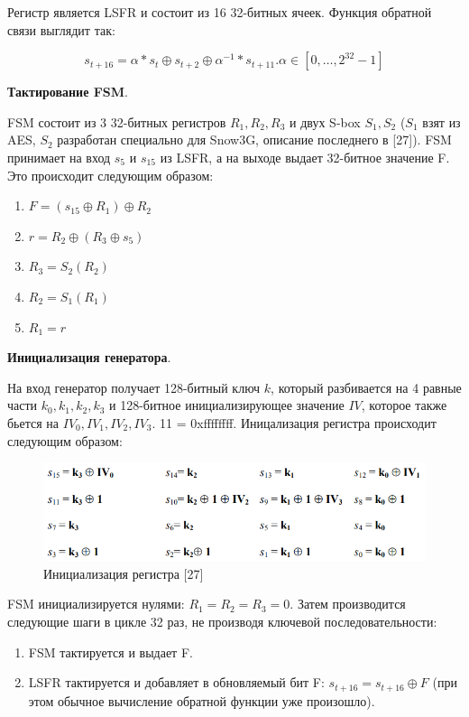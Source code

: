 \documentclass[colorthm]{./civarticle}
\begin{document}
Регистр является LSFR и состоит из 16 32-битных ячеек. Функция обратной связи выглядит так: 

\begin{equation}
    s_{t+16} = \alpha * s_t \oplus s_{t+2} \oplus \alpha^{-1}*s_{t+11}. \alpha \in [0, \dots, 2^{32}-1]
\end{equation}

\textbf{Тактирование FSM}. 

FSM состоит из 3 32-битных регистров $R_1, R_2, R_3$ и двух S-box $S_1, S_2$ ($S_1$ взят из AES, $S_2$ разработан специально для Snow3G, описание последнего в [27]). FSM принимает на вход $s_5$ и $s_{15}$ из LSFR, а на выходе выдает 32-битное значение F. Это происходит следующим образом: 

\begin{enumerate}
    \item $F = (s_{15} \oplus R_1) \oplus R_2$
    \item $r = R_2 \oplus (R_3 \oplus s_5)$
    \item $R_3 = S_2(R_2)$
    \item $R_2 = S_1(R_1)$
    \item $R_1 = r$
\end{enumerate}

\textbf{Инициализация генератора}.

На вход генератор получает 128-битный ключ $k$, который разбивается на 4 равные части $k_0, k_1, k_2, k_3$ и 128-битное инициализирующее значение $IV$, которое также бьется на $IV_0, IV_1, IV_2, IV_3$. 1\textbf{}{1} = 0xffffffff. Иницализация регистра происходит следующим образом:

\begin{figure}[H]
    \centering
    \includegraphics[width=0.75\linewidth]{Снимок экрана 2024-01-12 144510.png}
    \caption{Инициализация регистра [27]}
    \label{fig:enter-label}
\end{figure}

FSM инициализируется нулями: $R_1 = R_2 = R_3 = 0$. Затем производится следующие шаги в цикле 32 раз, не производя ключевой последовательности:

\begin{enumerate}
    \item FSM тактируется и выдает F.
    \item LSFR тактируется и добавляет в обновляемый бит F: $s_{t+16} = s_{t+16} \oplus F$ (при этом обычное вычисление обратной функции уже произошло).
\end{enumerate}
\end{document}
